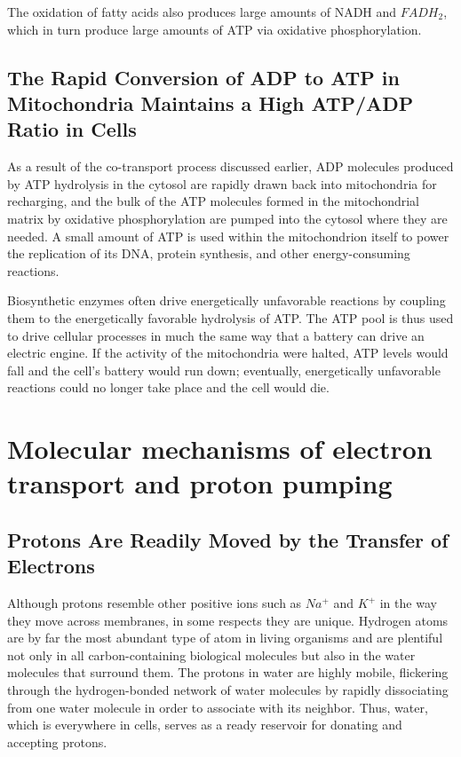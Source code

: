 The oxidation of fatty acids also produces large amounts of NADH and
$FADH_2$, which in turn produce large amounts of ATP via oxidative
phosphorylation.

\subsection{The Rapid Conversion of ADP to ATP in Mitochondria Maintains a High ATP/ADP Ratio in Cells}

As a result of the co-transport process discussed earlier, ADP molecules
produced by ATP hydrolysis in the cytosol are rapidly drawn back into
mitochondria for recharging, and the bulk of the ATP molecules formed in
the mitochondrial matrix by oxidative phosphorylation are pumped into
the cytosol where they are needed. A small amount of ATP is used within
the mitochondrion itself to power the replication of its DNA, protein synthesis,
and other energy-consuming reactions.

Biosynthetic enzymes often drive energetically
unfavorable reactions by coupling them to the energetically favorable
hydrolysis of ATP. The ATP pool is thus used to drive
cellular processes in much the same way that a battery can drive an electric
engine. If the activity of the mitochondria were halted, ATP levels
would fall and the cell’s battery would run down; eventually, energetically
unfavorable reactions could no longer take place and the cell would die.

\section{Molecular mechanisms of electron transport and proton pumping}

\subsection{Protons Are Readily Moved by the Transfer of Electrons}

Although protons resemble other positive ions such as $Na^+$ and $K^+$ in the
way they move across membranes, in some respects they are unique.
Hydrogen atoms are by far the most abundant type of atom in living
organisms and are plentiful not only in all carbon-containing biological
molecules but also in the water molecules that surround them. The protons
in water are highly mobile, flickering through the hydrogen-bonded
network of water molecules by rapidly dissociating from one water
molecule in order to associate with its neighbor. Thus, water, which is
everywhere in cells, serves as a ready reservoir for donating and accepting
protons.

